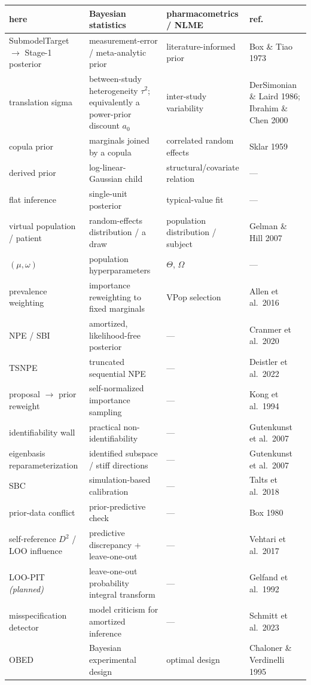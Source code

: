 \documentclass[11pt]{article}
\begin{document}
\begin{center}
\small
\begin{tabularx}{\textwidth}{@{}>{\raggedright\arraybackslash}p{3.25cm} X X >{\raggedright\arraybackslash}p{2.35cm}@{}}
\toprule
\textbf{here} & \textbf{Bayesian statistics} & \textbf{pharmacometrics / NLME} & \textbf{ref.} \\
\midrule
SubmodelTarget $\to$ Stage-1 posterior & measurement-error / meta-analytic prior & literature-informed prior & Box \& Tiao 1973 \\
translation sigma & between-study heterogeneity $\tau^2$; equivalently a power-prior discount $a_0$ & inter-study variability & DerSimonian \& Laird 1986; Ibrahim \& Chen 2000 \\
copula prior & marginals joined by a copula & correlated random effects & Sklar 1959 \\
derived prior & log-linear-Gaussian child & structural/covariate relation & --- \\
flat inference & single-unit posterior & typical-value fit & --- \\
virtual population / patient & random-effects distribution / a draw & population distribution / subject & Gelman \& Hill 2007 \\
$(\mu,\omega)$ & population hyperparameters & $\Theta$, $\Omega$ & --- \\
prevalence weighting & importance reweighting to fixed marginals & VPop selection & Allen et al.\ 2016 \\
NPE / SBI & amortized, likelihood-free posterior & --- & Cranmer et al.\ 2020 \\
TSNPE & truncated sequential NPE & --- & Deistler et al.\ 2022 \\
proposal $\to$ prior reweight & self-normalized importance sampling & --- & Kong et al.\ 1994 \\
identifiability wall & practical non-identifiability & --- & Gutenkunst et al.\ 2007 \\
eigenbasis reparameterization & identified subspace / stiff directions & --- & Gutenkunst et al.\ 2007 \\
SBC & simulation-based calibration & --- & Talts et al.\ 2018 \\
prior-data conflict & prior-predictive check & --- & Box 1980 \\
self-reference $D^2$ / LOO influence & predictive discrepancy + leave-one-out & --- & Vehtari et al.\ 2017 \\
LOO-PIT \emph{(planned)} & leave-one-out probability integral transform & --- & Gelfand et al.\ 1992 \\
misspecification detector & model criticism for amortized inference & --- & Schmitt et al.\ 2023 \\
OBED & Bayesian experimental design & optimal design & Chaloner \& Verdinelli 1995 \\
\bottomrule
\end{tabularx}
\end{center}
\end{document}
